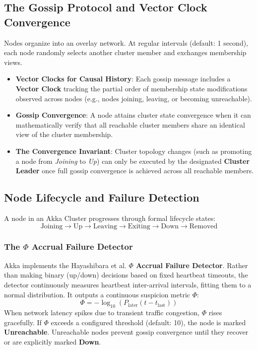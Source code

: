 \subsection{The Gossip Protocol and Vector Clock Convergence}
Nodes organize into an overlay network. At regular intervals (default: 1 second), each node randomly selects another cluster member and exchanges membership views.
\begin{itemize}
    \item \textbf{Vector Clocks for Causal History}: Each gossip message includes a \textbf{Vector Clock} tracking the partial order of membership state modifications observed across nodes (e.g., nodes joining, leaving, or becoming unreachable).
    \item \textbf{Gossip Convergence}: A node attains cluster state convergence when it can mathematically verify that all reachable cluster members share an identical view of the cluster membership.
    \item \textbf{The Convergence Invariant}: Cluster topology changes (such as promoting a node from \textit{Joining} to \textit{Up}) can only be executed by the designated \textbf{Cluster Leader} once full gossip convergence is achieved across all reachable members.
\end{itemize}

\subsection{Node Lifecycle and Failure Detection}
A node in an Akka Cluster progresses through formal lifecycle states:
\begin{equation}
\text{Joining} \longrightarrow \text{Up} \longrightarrow \text{Leaving} \longrightarrow \text{Exiting} \longrightarrow \text{Down} \longrightarrow \text{Removed}
\end{equation}

\subsubsection{The $\Phi$ Accrual Failure Detector}
Akka implements the Hayashibara et al. \textbf{$\Phi$ Accrual Failure Detector}. Rather than making binary (up/down) decisions based on fixed heartbeat timeouts, the detector continuously measures heartbeat inter-arrival intervals, fitting them to a normal distribution. It outputs a continuous suspicion metric $\Phi$:
\begin{equation}
\Phi = -\log_{10}(P_{\text{later}}(t - t_{\text{last}}))
\end{equation}
When network latency spikes due to transient traffic congestion, $\Phi$ rises gracefully. If $\Phi$ exceeds a configured threshold (default: 10), the node is marked \textbf{Unreachable}. Unreachable nodes prevent gossip convergence until they recover or are explicitly marked \textbf{Down}.


